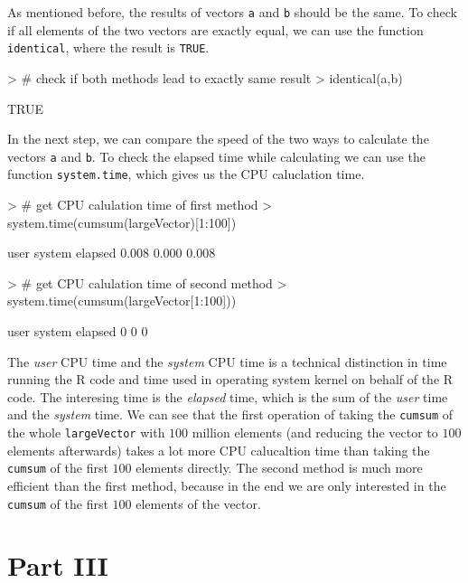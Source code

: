 \documentclass{article}
\begin{document}
As mentioned before, the results of vectors \texttt{a} and \texttt{b} should be the same. To check if all elements of the two vectors are exactly equal, we can use the function \texttt{identical}, where the result is \texttt{TRUE}.

\begin{Schunk}
\begin{Sinput}
> # check if both methods lead to exactly same result
> identical(a,b)
\end{Sinput}
\begin{Soutput}
[1] TRUE
\end{Soutput}
\end{Schunk}

In the next step, we can compare the speed of the two ways to calculate the vectors \texttt{a} and \texttt{b}. To check the elapsed time while calculating we can use the function \texttt{system.time}, which gives us the CPU caluclation time.

\begin{Schunk}
\begin{Sinput}
> # get CPU calulation time of first method
> system.time(cumsum(largeVector)[1:100])
\end{Sinput}
\begin{Soutput}
   user  system elapsed 
  0.008   0.000   0.008 
\end{Soutput}
\begin{Sinput}
> # get CPU calulation time of second method
> system.time(cumsum(largeVector[1:100]))
\end{Sinput}
\begin{Soutput}
   user  system elapsed 
      0       0       0 
\end{Soutput}
\end{Schunk}

The \emph{user} CPU time and the \emph{system} CPU time is a technical distinction in time running the R code and time used in operating system kernel on behalf of the R code. The interesing time is the \emph{elapsed} time, which is the sum of the \emph{user} time and the \emph{system} time. We can see that the first operation of taking the \texttt{cumsum} of the whole \texttt{largeVector} with $100$ million elements (and reducing the vector to $100$ elements afterwards) takes a lot more CPU calucaltion time than taking the \texttt{cumsum} of the first $100$ elements directly. The second method is much more efficient than the first method, because in the end we are only interested in the \texttt{cumsum} of the first $100$ elements of the vector.

\section{Part III}
\end{document}
